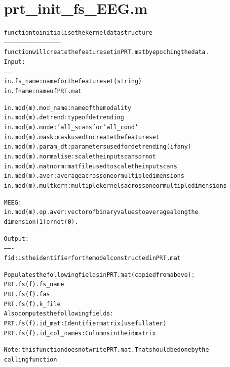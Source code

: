 \section{prt\_init\_fs\_EEG.m}
\begin{alltt}

 function to initialise the kernel data structure
 ------------------------------------------------
 function will create the feature set in PRT.mat by epoching the data.
 Input:
 ------
 in.fs\_name: name for the feature set (string)
 in.fname:   name of PRT.mat
 
 in.mod(m).mod\_name:  name of the modality
 in.mod(m).detrend:   type of detrending
 in.mod(m).mode:      'all\_scans' or 'all\_cond'
 in.mod(m).mask:	   mask used to create the feature set
 in.mod(m).param\_dt:  parameters used for detrending (if any)
 in.mod(m).normalise: scale the input scans or not
 in.mod(m).matnorm:   mat file used to scale the input scans
 in.mod(m).aver:       average across one or multiple dimensions
 in.mod(m).multkern:   multiple kernels across one or multiple dimensions
 
MEEG:
in.mod(m).op.aver: vector of binary values to average along the
dimension (1) or not (0).
 
 Output:
 -------
 fid : is the identifier for the model constructed in PRT.mat
 
 Populates the following fields in PRT.mat (copied from above):
   PRT.fs(f).fs\_name
   PRT.fs(f).fas
   PRT.fs(f).k\_file
 Also computes the following fields:
   PRT.fs(f).id\_mat:       Identifier matrix (useful later)
   PRT.fs(f).id\_col\_names: Columns in the id matrix
 
 Note: this function does not write PRT.mat. That should be done by the
       calling function
\end{alltt}


